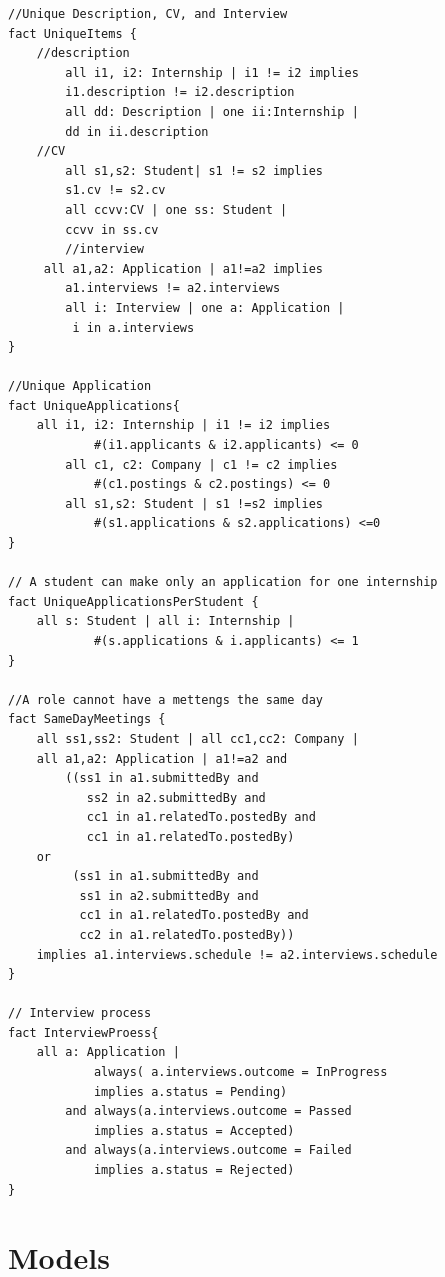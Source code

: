 \begin{lstlisting}
//Unique Description, CV, and Interview 
fact UniqueItems {
	//description
    	all i1, i2: Internship | i1 != i2 implies
   		i1.description != i2.description
    	all dd: Description | one ii:Internship | 
		dd in ii.description
	//CV
    	all s1,s2: Student| s1 != s2 implies
		s1.cv != s2.cv
    	all ccvv:CV | one ss: Student |  
		ccvv in ss.cv
    	//interview
   	 all a1,a2: Application | a1!=a2 implies 
   		a1.interviews != a2.interviews
    	all i: Interview | one a: Application |
		 i in a.interviews
}

//Unique Application
fact UniqueApplications{
	all i1, i2: Internship | i1 != i2 implies 
    		#(i1.applicants & i2.applicants) <= 0
    	all c1, c2: Company | c1 != c2 implies 
    		#(c1.postings & c2.postings) <= 0
    	all s1,s2: Student | s1 !=s2 implies 
    		#(s1.applications & s2.applications) <=0
}

// A student can make only an application for one internship
fact UniqueApplicationsPerStudent {
	all s: Student | all i: Internship | 
    		#(s.applications & i.applicants) <= 1
}

//A role cannot have a mettengs the same day
fact SameDayMeetings {
	all ss1,ss2: Student | all cc1,cc2: Company |
   	all a1,a2: Application | a1!=a2 and
   		((ss1 in a1.submittedBy and 
		   ss2 in a2.submittedBy and
   		   cc1 in a1.relatedTo.postedBy and
		   cc1 in a1.relatedTo.postedBy)
   	or
   		 (ss1 in a1.submittedBy and 
		  ss1 in a2.submittedBy and
   		  cc1 in a1.relatedTo.postedBy and 
		  cc2 in a1.relatedTo.postedBy))
   	implies a1.interviews.schedule != a2.interviews.schedule
}

// Interview process
fact InterviewProess{ 
	all a: Application | 
        	always( a.interviews.outcome = InProgress 
			implies a.status = Pending)
	 	and always(a.interviews.outcome = Passed 
			implies a.status = Accepted)
		and always(a.interviews.outcome = Failed 
			implies a.status = Rejected)
}

\end{lstlisting}



\section{ Models}
